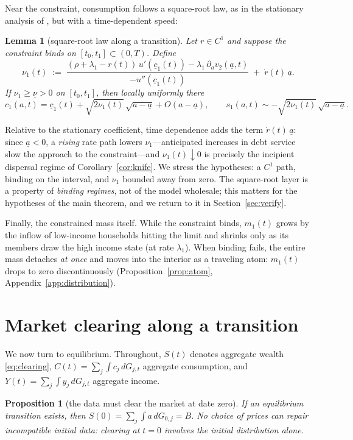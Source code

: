 \documentclass[11pt]{article}
\newtheorem{proposition}[theorem]{Proposition}
\newtheorem{lemma}[theorem]{Lemma}
\theoremstyle{definition}
\theoremstyle{remark}
\newcommand{\ubar}[1]{\underline{#1}}
\newcommand{\dd}{\,d}
\newcommand{\ubc}{\ubar{c}}
\newcommand{\uba}{\ubar{a}}
\begin{document}
Near the constraint, consumption follows a square-root law, as in the
stationary analysis of \citet{AHLLM2022}, but with a time-dependent
speed:

\begin{lemma}[square-root law along a transition]\label{lem:sqrt}
Let $r\in C^1$ and suppose the constraint binds on
$[t_0,t_1]\subset(0,T)$. Define
\[
\nu_1(t)\;:=\;\frac{(\rho+\lambda_1-r(t))\,u'(\ubc_1(t))
-\lambda_1\,\partial_a v_2(\uba,t)}{-u''(\ubc_1(t))}
\;+\;\dot r(t)\,\uba .
\]
If $\nu_1\ge\ubar\nu>0$ on $[t_0,t_1]$, then locally uniformly there
\[
c_1(a,t)=\ubc_1(t)+\sqrt{2\nu_1(t)}\,\sqrt{a-\uba}+O(a-\uba),
\qquad
s_1(a,t)\sim-\sqrt{2\nu_1(t)}\,\sqrt{a-\uba}.
\]
\end{lemma}

Relative to the stationary coefficient, time dependence adds the term
$\dot r(t)\,\uba$: since $\uba<0$, a \emph{rising} rate path lowers
$\nu_1$---anticipated increases in debt service slow the approach to
the constraint---and $\nu_1(t)\downarrow0$ is precisely the incipient
dispersal regime of Corollary~\ref{cor:knife}. We stress the
hypotheses: a $C^1$ path, binding on the interval, and
$\nu_1$ bounded away from zero. The square-root layer is a property of
\emph{binding regimes}, not of the model wholesale; this matters for
the hypotheses of the main theorem, and we return to it in
Section~\ref{sec:verify}.

Finally, the constrained mass itself. While the constraint binds,
$m_1(t)$ grows by the inflow of low-income households hitting the
limit and shrinks only as its members draw the high income state (at
rate $\lambda_1$). When binding fails, the entire mass detaches
\emph{at once} and moves into the interior as a traveling atom:
$m_1(t)$ drops to zero discontinuously
(Proposition~\ref{prop:atom}, Appendix~\ref{app:distribution}).

\section{Market clearing along a transition}
\label{sec:clearing}

We now turn to equilibrium. Throughout, $S(t)$ denotes aggregate
wealth \eqref{eq:clearing}, $C(t)=\sum_j\int c_j\dd G_{j,t}$ aggregate
consumption, and $Y(t)=\sum_j\int y_j\dd G_{j,t}$ aggregate income.

\begin{proposition}[the data must clear the market at date zero]
\label{prop:compat}
If an equilibrium transition exists, then $S(0)=\sum_j\int a\dd
G_{0,j}=B$. No choice of prices can repair incompatible initial data:
clearing at $t=0$ involves the initial distribution alone.
\end{proposition}
\end{document}
